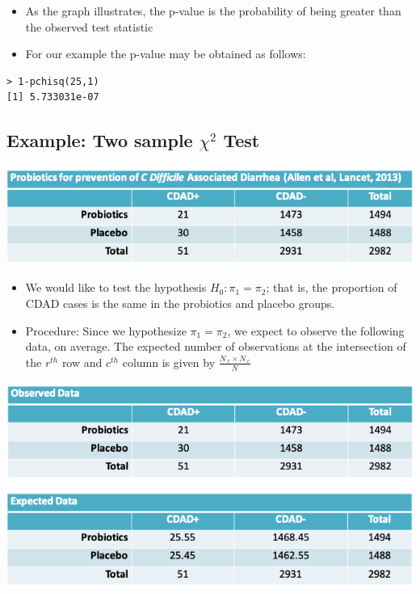 \documentclass[
]{book}
\providecommand{\tightlist}{%
  \setlength{\itemsep}{0pt}\setlength{\parskip}{0pt}}
\begin{document}
\begin{itemize}
\tightlist
\item
  As the graph illustrates, the p-value is the probability of being greater than the observed test statistic
\item
  For our example the p-value may be obtained as follows:
\end{itemize}

\begin{verbatim}
> 1-pchisq(25,1)
[1] 5.733031e-07
\end{verbatim}

\hypertarget{example-two-sample-chi2-test}{%
\subsection{\texorpdfstring{Example: Two sample \(\chi^2\) Test}{Example: Two sample \textbackslash chi\^{}2 Test}}\label{example-two-sample-chi2-test}}

\includegraphics[width=1\linewidth]{./8_37}

\begin{itemize}
\tightlist
\item
  We would like to test the hypothesis \(H_0:\pi_1=\pi_2\); that is, the proportion of CDAD cases is the same in the probiotics and placebo groups.
\item
  Procedure: Since we hypothesize \(\pi_1=\pi_2\), we expect to observe the following data, on average. The expected number of observations at the intersection of the \(r^{th}\) row and \(c^{th}\) column is given by \(\frac{N_{.r}\times N_{.c}}{N}\)
\end{itemize}

\includegraphics[width=1\linewidth]{./8_38}
\end{document}
